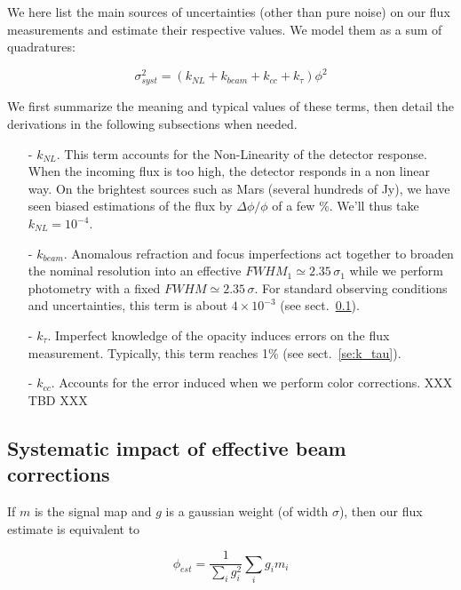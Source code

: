 

We here list the main sources of uncertainties (other than pure noise) on our flux measurements and
estimate their respective values. We model them as a sum of quadratures:

\begin{equation}
\sigma_{syst}^2 = (k_{NL} + k_{beam} + k_{cc} + k_\tau)\phi^2
\end{equation}

We first summarize the meaning and typical values of these terms, then detail
the derivations in the following subsections when needed.

\begin{itemize}
\item[-] $k_{NL}$. This term accounts for the Non-Linearity of the detector response. When the incoming flux is too
  high, the detector responds in a non linear way. On the brightest sources
  such as Mars (several hundreds of Jy), we have seen biased estimations of the
  flux by $\Delta\phi/\phi$ of a few \%. We'll thus take $k_{NL}=10^{-4}$.
\item[-] $k_{beam}$. Anomalous refraction and focus imperfections act together to
  broaden the nominal resolution into an effective $FWHM_1 \simeq 2.35\,\sigma_1$ while we perform
  photometry with a fixed $FWHM \simeq 2.35\,\sigma$. For standard observing
  conditions and uncertainties, this term is about $4\times 10^{-3}$ (see sect.~\ref{se:k_beam}).
\item[-] $k_\tau$. Imperfect knowledge of the opacity induces errors on the flux
  measurement. Typically, this term reaches 1\% (see sect.~\ref{se:k_tau}).
\item[-] $k_{cc}$. Accounts for the error induced when we perform color
  corrections. XXX TBD XXX
\end{itemize}


\subsection{Systematic impact of effective beam corrections}
\label{se:k_beam}

 If $m$ is the signal map and $g$ is
  a gaussian weight (of width $\sigma$), then our flux estimate is equivalent to

\begin{equation}
\phi_{est} = \frac{1}{\sum_i g_i^2}\sum_i g_im_i
\end{equation}

